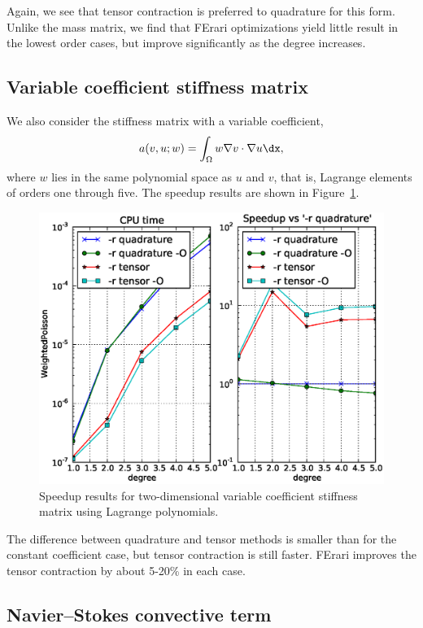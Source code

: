 Again, we see that tensor contraction is preferred to quadrature for
this form. Unlike the mass matrix, we find that FErari optimizations
yield little result in the lowest order cases, but improve
significantly as the degree increases.

\subsection{Variable coefficient stiffness matrix}

We also consider the stiffness matrix with a variable coefficient,
\begin{equation}
  a(v, u; w) = \int_{\Omega} w \nabla v \cdot \nabla u \dx,
\end{equation}
where \( w \) lies in the same polynomial space as \( u \) and \( v\),
that is, Lagrange elements of orders one through five. The speedup
results are shown in Figure~\ref{fig:WeightedPoisson}.

\begin{figure}
  \begin{center}
    \includegraphics[width=12cm]{chapters/kirby-3/eps/WeightedPoisson.eps}
    \caption{Speedup results for two-dimensional variable coefficient stiffness matrix using Lagrange polynomials.}
    \label{fig:WeightedPoisson}
  \end{center}
\end{figure}
The difference between quadrature and tensor methods is smaller than
for the constant coefficient case, but tensor contraction is still
faster. FErari improves the tensor contraction by about 5-20\% in each
case.

\subsection{Navier--Stokes convective term}

